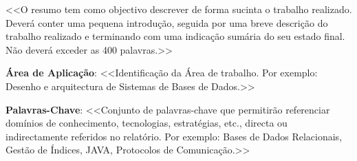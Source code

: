 \documentclass[a4paper,12pt]{scrreprt}
\begin{document}

\makecover




\renewenvironment{abstract}
 {\par\noindent\textbf{\Large\abstractname}\par\bigskip}
 {}

\begin{flushleft}
\begin{abstract}
    <<O resumo tem como objectivo descrever de forma sucinta o trabalho realizado. Deverá conter uma pequena introdução, seguida por uma breve descrição do trabalho realizado e terminando com uma indicação sumária do seu estado final. Não deverá exceder as 400 palavras.>> 
    \par \textbf{Área de Aplicação}: <<Identificação da Área de trabalho. Por exemplo: Desenho e arquitectura de Sistemas de Bases de Dados.>> 
    \par \textbf{Palavras-Chave}: <<Conjunto de palavras-chave que permitirão referenciar domínios de conhecimento, tecnologias, estratégias, etc., directa ou indirectamente referidos no relatório. Por exemplo: Bases de Dados Relacionais, Gestão de Índices, JAVA, Protocolos de Comunicação.>>
\end{abstract}
\end{flushleft}


\pagebreak



\renewcommand{\contentsname}{Índice}

\tableofcontents

\pagebreak

\listoffigures

\pagebreak
\end{document}
